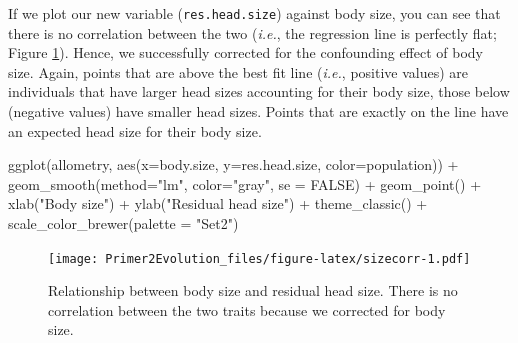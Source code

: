 \documentclass[
]{book}
\newenvironment{Shaded}{\begin{snugshade}}{\end{snugshade}}
\newcommand{\AttributeTok}[1]{\textcolor[rgb]{0.77,0.63,0.00}{#1}}
\newcommand{\CommentTok}[1]{\textcolor[rgb]{0.56,0.35,0.01}{\textit{#1}}}
\newcommand{\ConstantTok}[1]{\textcolor[rgb]{0.00,0.00,0.00}{#1}}
\newcommand{\FunctionTok}[1]{\textcolor[rgb]{0.00,0.00,0.00}{#1}}
\newcommand{\NormalTok}[1]{#1}
\newcommand{\OtherTok}[1]{\textcolor[rgb]{0.56,0.35,0.01}{#1}}
\newcommand{\SpecialCharTok}[1]{\textcolor[rgb]{0.00,0.00,0.00}{#1}}
\newcommand{\StringTok}[1]{\textcolor[rgb]{0.31,0.60,0.02}{#1}}
\begin{document}
\begin{Shaded}
\end{Shaded}

If we plot our new variable (\texttt{res.head.size}) against body size, you can see that there is no correlation between the two (\emph{i.e.}, the regression line is perfectly flat; Figure \ref{fig:sizecorr}). Hence, we successfully corrected for the confounding effect of body size. Again, points that are above the best fit line (\emph{i.e.}, positive values) are individuals that have larger head sizes accounting for their body size, those below (negative values) have smaller head sizes. Points that are exactly on the line have an expected head size for their body size.

\begin{Shaded}
\begin{Highlighting}[]
\FunctionTok{ggplot}\NormalTok{(allometry, }\FunctionTok{aes}\NormalTok{(}\AttributeTok{x=}\NormalTok{body.size, }\AttributeTok{y=}\NormalTok{res.head.size, }\AttributeTok{color=}\NormalTok{population)) }\SpecialCharTok{+}
    \FunctionTok{geom\_smooth}\NormalTok{(}\AttributeTok{method=}\StringTok{"lm"}\NormalTok{, }\AttributeTok{color=}\StringTok{"gray"}\NormalTok{, }\AttributeTok{se =} \ConstantTok{FALSE}\NormalTok{) }\SpecialCharTok{+}
    \FunctionTok{geom\_point}\NormalTok{() }\SpecialCharTok{+}
    \FunctionTok{xlab}\NormalTok{(}\StringTok{"Body size"}\NormalTok{) }\SpecialCharTok{+}
    \FunctionTok{ylab}\NormalTok{(}\StringTok{"Residual head size"}\NormalTok{) }\SpecialCharTok{+}
    \FunctionTok{theme\_classic}\NormalTok{() }\SpecialCharTok{+}
    \FunctionTok{scale\_color\_brewer}\NormalTok{(}\AttributeTok{palette =} \StringTok{"Set2"}\NormalTok{)}
\end{Highlighting}
\end{Shaded}

\begin{figure}
\centering
\texttt{[image: Primer2Evolution\_files/figure-latex/sizecorr-1.pdf]}
\caption{\label{fig:sizecorr}Relationship between body size and residual head size. There is no correlation between the two traits because we corrected for body size.}
\end{figure}
\end{document}
